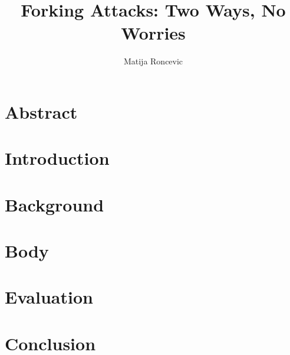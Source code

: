 \documentclass[sigconf]{acmart}
\title{Forking Attacks: Two Ways, No Worries}
\author{Matija Roncevic}
\affiliation{
    \institution{Friedricht-Alexander-Universität Erlangen-Nürnberg}
    \country{}
    \city{}}
\begin{document}
\maketitle  %




\section{Abstract}


\section{Introduction}


\section{Background}


\section{Body}


\section{Evaluation}


\section{Conclusion}



\end{document}
